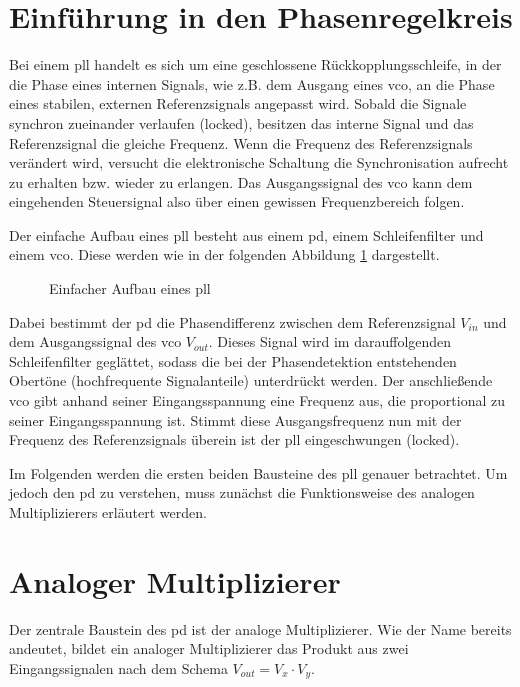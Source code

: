 \documentclass[../main.tex]{subfiles}
\begin{document}
\section{Einführung in den Phasenregelkreis}     
Bei einem \gls{pll} handelt es sich um eine geschlossene Rückkopplungsschleife, in der die Phase eines internen Signals, wie z.B. dem Ausgang eines \gls{vco}, an die Phase eines stabilen, externen Referenzsignals angepasst wird. Sobald die Signale synchron zueinander verlaufen (locked), besitzen das interne Signal und das Referenzsignal die gleiche Frequenz. Wenn die Frequenz des Referenzsignals verändert wird, versucht die elektronische Schaltung die Synchronisation aufrecht zu erhalten bzw. wieder zu erlangen. Das Ausgangssignal des \gls{vco} kann dem eingehenden Steuersignal also über einen gewissen Frequenzbereich folgen.\cite{chengCom}\par
\medskip
Der einfache Aufbau eines \gls{pll} besteht aus einem \gls{pd}, einem Schleifenfilter und einem \gls{vco}. Diese werden wie in der folgenden Abbildung \ref{fig:bsb_pll} dargestellt.\par


\begin{figure}[H]
  \centering
  \resizebox{0.8\textwidth}{!}{}
  \caption{Einfacher Aufbau eines \gls{pll} \cite{razaviRF}}
  \label{fig:bsb_pll}
\end{figure}


Dabei bestimmt der \gls{pd} die Phasendifferenz zwischen dem Referenzsignal $V_{in}$ und dem Ausgangssignal des \gls{vco} $V_{out}$. Dieses Signal wird im darauffolgenden Schleifenfilter geglättet, sodass die bei der Phasendetektion entstehenden Obertöne (hochfrequente Signalanteile) unterdrückt werden. Der anschließende \gls{vco} gibt anhand seiner Eingangsspannung eine Frequenz aus, die proportional zu seiner Eingangsspannung ist. Stimmt diese Ausgangsfrequenz nun mit der Frequenz des Referenzsignals überein ist der \gls{pll} eingeschwungen (locked).\cite{chengCom}\par
\medskip
Im Folgenden werden die ersten beiden Bausteine des \gls{pll} genauer betrachtet. Um jedoch den \gls{pd} zu verstehen, muss zunächst die Funktionsweise des analogen Multiplizierers erläutert werden.\par





\section{Analoger Multiplizierer}
\label{sec:multi}
Der zentrale Baustein des \gls{pd} ist der analoge Multiplizierer. Wie der Name bereits andeutet, bildet ein analoger Multiplizierer das Produkt aus zwei Eingangssignalen nach dem Schema $V_{out} =V_x \cdot V_y$. 
\end{document}
